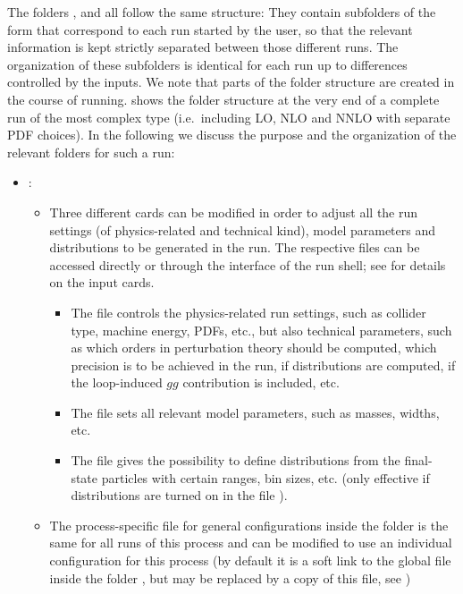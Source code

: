 \documentclass[english,11pt]{article}
\begin{document}
The folders ,  and  all follow the same structure: They contain subfolders of the form 
 that correspond to each run started by the user, so that the relevant information is kept 
strictly separated between those different runs. The organization of these subfolders is identical for each run up 
to differences controlled by the inputs. We note that parts of the folder structure 
are created in the course of running.  shows the folder structure at the very end of a 
complete run of the most complex type (i.e.\ including LO, NLO and NNLO with separate PDF choices). 
In the following we discuss the purpose and the organization of the relevant folders for such a run:
\begin{itemize}
\item {}:\\[-0.7cm]
\begin{itemize}[leftmargin=*]
\item Three different cards can be modified in order to adjust all the run settings (of physics-related and technical kind), model parameters and distributions to be generated in the run. The respective files can be accessed directly or through the interface of the \Matrix{} run shell; see  for details on the input cards.%
\begin{itemize}[leftmargin=*]
\item The file  controls the physics-related run settings, such as collider type, machine energy, PDFs, etc., but also
technical parameters, such as which orders in perturbation theory should be computed, which precision is to be achieved in the run, if distributions are computed, if the loop-induced $gg$ contribution is included, etc.%
\item The file  sets all relevant model parameters, such as masses, widths, etc.%
\item The file  gives the possibility to define distributions from the final-state particles with certain ranges, bin sizes, etc. (only effective if distributions are turned on in the file ).
\end{itemize}
\item The process-specific file  for general \Matrix{} configurations inside the folder  is the same for all runs of this process and can be modified to use an individual configuration for this process (by default it is a soft link to the global file  inside the folder \Matrixversion{}, but may be replaced by a copy of this file, see )

\end{itemize}
\end{itemize}
\end{document}
